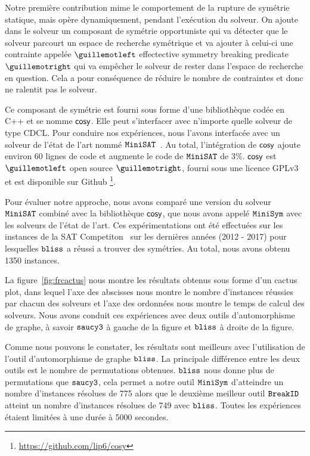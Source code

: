 Notre première contribution mime le comportement de la rupture de symétrie statique, mais 
opère dynamiquement, pendant l'exécution du solveur. On ajoute dans le solveur un composant de symétrie opportuniste qui va détecter que le solveur parcourt un espace de recherche symétrique et va ajouter à celui-ci une contrainte appelée $\guillemotleft$ effectective symmetry breaking predicate $\guillemotright$ qui va empêcher le solveur de rester dans
l'espace de recherche en question. Cela a pour conséquence de réduire le nombre de contraintes et donc 
ne ralentit pas le solveur.


Ce composant de symétrie est fourni sous forme d'une bibliothèque codée en C++ et se nomme $\textsf{cosy}$.
Elle peut s'interfacer avec n'importe quelle solveur de type CDCL. 
Pour conduire nos expériences, nous l'avons interfacée avec un solveur de l'état de l'art nommé $\texttt{MiniSAT}$~\cite{een2003extensible}. Au total, l'intégration de $\textsf{cosy}$ ajoute environ 60 lignes de code 
et augmente le code de $\texttt{MiniSAT}$ de 3\%.
$\textsf{cosy}$ est $\guillemotleft$ open source $\guillemotright$, fourni sous une licence GPLv3 et est disponible sur Github \footnote{\url{https://github.com/lip6/cosy}}.


Pour évaluer notre approche, nous avons comparé une version du solveur $\texttt{MiniSAT}$ combiné avec la bibliothèque $\textsf{cosy}$, que nous avons appelé $\texttt{MiniSym}$ avec les solveurs de l'état de l'art.
Ces expérimentations ont été effectuées sur les instances de la SAT Competiton~\cite{jarvisalo2012international} sur les dernières années (2012 - 2017) pour lesquelles $\texttt{bliss}$ a réussi a trouver des symétries. Au total, nous avons obtenu 1350 instances.

La figure~\ref{fig:frcactus} nous montre les résultats obtenus sous forme d'un cactus plot, 
dans lequel l'axe des abscisses nous montre le nombre d'instances réussies par chacun des solveurs et l'axe des ordonnées nous montre le temps de calcul des solveurs.
Nous avons conduit ces expériences avec deux outils d'automorphisme de graphe, à savoir 
$\texttt{saucy3}$ à gauche de la figure et $\texttt{bliss}$ à droite de la figure. 

Comme nous pouvons le constater, les résultats sont meilleurs  avec l'utilisation de l'outil d'automorphisme de 
graphe $\texttt{bliss}$. La principale différence entre les deux outils est le nombre de permutations obtenues.
$\texttt{bliss}$ nous donne plus de permutations que $\texttt{saucy3}$, cela permet a notre outil $\texttt{MiniSym}$ d'atteindre 
un nombre d'instances résolues de 775 alors que le deuxième meilleur outil $\texttt{BreakID}$ atteint un nombre d'instances résolues de 749 avec $\texttt{bliss}$. Toutes les expériences étaient limitées à une durée à 5000 secondes.

